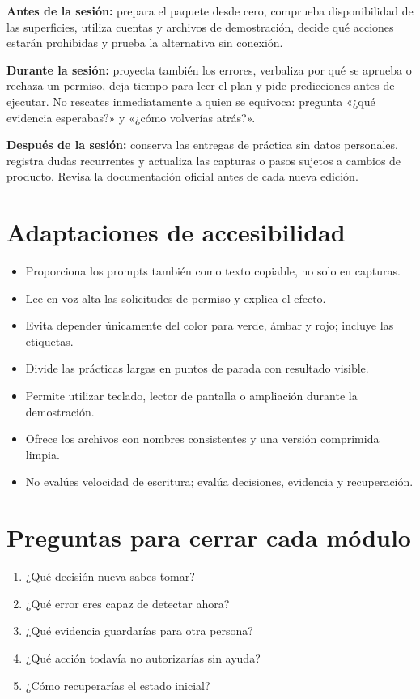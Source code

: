 \documentclass[10pt,a4paper,openany]{book}
\providecommand{\tightlist}{\setlength{\itemsep}{0.18em}\setlength{\parskip}{0pt}}
\begin{document}
\textbf{Antes de la sesión:} prepara el paquete desde cero, comprueba
disponibilidad de las superficies, utiliza cuentas y archivos de
demostración, decide qué acciones estarán prohibidas y prueba la
alternativa sin conexión.

\textbf{Durante la sesión:} proyecta también los errores, verbaliza por
qué se aprueba o rechaza un permiso, deja tiempo para leer el plan y
pide predicciones antes de ejecutar. No rescates inmediatamente a quien
se equivoca: pregunta «¿qué evidencia esperabas?» y «¿cómo volverías
atrás?».

\textbf{Después de la sesión:} conserva las entregas de práctica sin
datos personales, registra dudas recurrentes y actualiza las capturas o
pasos sujetos a cambios de producto. Revisa la documentación oficial
antes de cada nueva edición.

\section{Adaptaciones de
accesibilidad}\label{adaptaciones-de-accesibilidad}

\begin{itemize}
\tightlist
\item
  Proporciona los prompts también como texto copiable, no solo en
  capturas.
\item
  Lee en voz alta las solicitudes de permiso y explica el efecto.
\item
  Evita depender únicamente del color para verde, ámbar y rojo; incluye
  las etiquetas.
\item
  Divide las prácticas largas en puntos de parada con resultado visible.
\item
  Permite utilizar teclado, lector de pantalla o ampliación durante la
  demostración.
\item
  Ofrece los archivos con nombres consistentes y una versión comprimida
  limpia.
\item
  No evalúes velocidad de escritura; evalúa decisiones, evidencia y
  recuperación.
\end{itemize}

\section{Preguntas para cerrar cada
módulo}\label{preguntas-para-cerrar-cada-muxf3dulo}

\begin{enumerate}
\def\labelenumi{\arabic{enumi}.}
\tightlist
\item
  ¿Qué decisión nueva sabes tomar?
\item
  ¿Qué error eres capaz de detectar ahora?
\item
  ¿Qué evidencia guardarías para otra persona?
\item
  ¿Qué acción todavía no autorizarías sin ayuda?
\item
  ¿Cómo recuperarías el estado inicial?
\end{enumerate}
\end{document}
